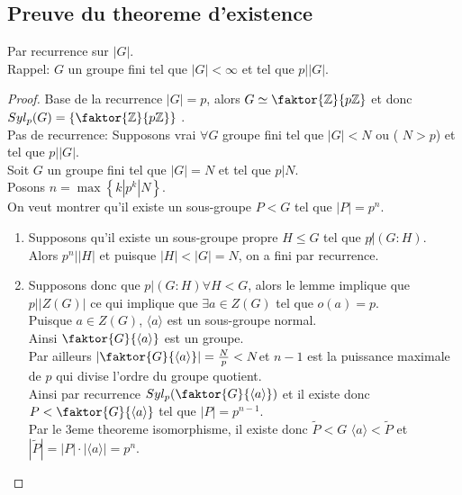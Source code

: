 \documentclass[../main.tex]{subfiles}
\begin{document}
\subsection{Preuve du theoreme d'existence}
Par recurrence sur $|G|$.\\
Rappel: $G $ un groupe fini tel que $|G| < \infty $ et tel que $p| |G|$.\\
\begin{proof}
Base de la recurrence $|G| = p$, alors $G \simeq \faktor{ \mathbb{Z}}{p \mathbb{Z}}$ et donc $Syl_p ( G) = \left\{  \faktor{\mathbb{Z}}{p \mathbb{Z}} \right\} $ .\\
Pas de recurrence: Supposons vrai $\forall G$ groupe fini tel que $|G| < N$ ou ( $N> p$) et tel que $p | |G|$.\\
Soit $G$ un groupe fini tel que $|G| = N$ et tel que $p|N$.\\
Posons $n = \max \left\{ k | p^{k}|N \right\} $.\\
On veut montrer qu'il existe un sous-groupe $P < G$ tel que $|P| = p^{n}$.\\
\begin{enumerate}
\item Supposons qu'il existe un sous-groupe propre $H \leq  G$ tel que $p \not| ( G:H) $.\\
	Alors $p^{n}| |H|$ et puisque $|H|< |G| = N$, on a fini par recurrence.\\
\item Supposons donc que $p | ( G:H) \forall H < G$, alors le lemme implique que $p ||Z( G) |$ ce qui implique que $\exists a \in Z( G) $ tel que $o( a) = p$.\\
	Puisque $a \in Z( G) $, $\langle a \rangle $ est un sous-groupe normal.\\
	Ainsi $ \faktor{G }{\langle a\rangle}$ est un groupe.\\
	Par ailleurs $ | \faktor{G}{\langle a \rangle}| = \frac{N}{p}< N$et $n -1$ est la puissance maximale de $p$ qui divise l'ordre du groupe quotient.\\
	Ainsi par recurrence $ Syl_p(  \faktor{G}{\langle a \rangle}) $	et il existe donc $P < \faktor{G}{\langle a \rangle}$ tel que $ |P| = p^{n-1}$.\\
	Par le 3eme theoreme isomorphisme, il existe donc $\tilde P< G	$ 	 $\langle a\rangle < \tilde P$ et $|\tilde P | = |P| \cdot | \langle a \rangle|= p^{n}$.\\

\end{enumerate}

\end{proof}
\end{document}
